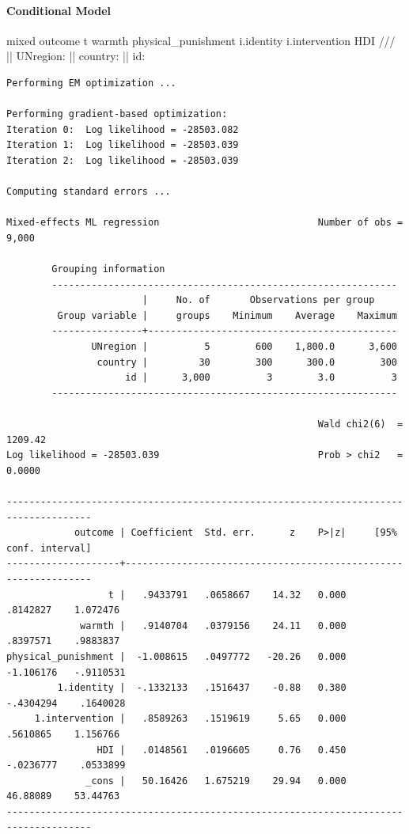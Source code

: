 \documentclass[
  letterpaper,
  DIV=11,
  numbers=noendperiod]{scrreprt}
\let\oldparagraph\paragraph
\renewcommand{\paragraph}[1]{\oldparagraph{#1}\mbox{}}
\newenvironment{Shaded}{\begin{snugshade}}{\end{snugshade}}
\newcommand{\CommentTok}[1]{\textcolor[rgb]{0.37,0.37,0.37}{#1}}
\newcommand{\KeywordTok}[1]{\textcolor[rgb]{0.00,0.23,0.31}{#1}}
\newcommand{\NormalTok}[1]{\textcolor[rgb]{0.00,0.23,0.31}{#1}}
\begin{document}
\paragraph{Conditional Model}\label{conditional-model}

\begin{Shaded}
\begin{Highlighting}[]

\NormalTok{mixed outcome t warmth physical\_punishment i.}\KeywordTok{identity}\NormalTok{ i.intervention HDI }\CommentTok{///}
\NormalTok{|| UNregion: || country: || id:}
  
\end{Highlighting}
\end{Shaded}

\begin{verbatim}
Performing EM optimization ...

Performing gradient-based optimization: 
Iteration 0:  Log likelihood = -28503.082  
Iteration 1:  Log likelihood = -28503.039  
Iteration 2:  Log likelihood = -28503.039  

Computing standard errors ...

Mixed-effects ML regression                            Number of obs =   9,000

        Grouping information
        -------------------------------------------------------------
                        |     No. of       Observations per group
         Group variable |     groups    Minimum    Average    Maximum
        ----------------+--------------------------------------------
               UNregion |          5        600    1,800.0      3,600
                country |         30        300      300.0        300
                     id |      3,000          3        3.0          3
        -------------------------------------------------------------

                                                       Wald chi2(6)  = 1209.42
Log likelihood = -28503.039                            Prob > chi2   =  0.0000

-------------------------------------------------------------------------------------
            outcome | Coefficient  Std. err.      z    P>|z|     [95% conf. interval]
--------------------+----------------------------------------------------------------
                  t |   .9433791   .0658667    14.32   0.000     .8142827    1.072476
             warmth |   .9140704   .0379156    24.11   0.000     .8397571    .9883837
physical_punishment |  -1.008615   .0497772   -20.26   0.000    -1.106176   -.9110531
         1.identity |  -.1332133   .1516437    -0.88   0.380    -.4304294    .1640028
     1.intervention |   .8589263   .1519619     5.65   0.000     .5610865    1.156766
                HDI |   .0148561   .0196605     0.76   0.450    -.0236777    .0533899
              _cons |   50.16426   1.675219    29.94   0.000     46.88089    53.44763
-------------------------------------------------------------------------------------


\end{verbatim}
\end{document}
